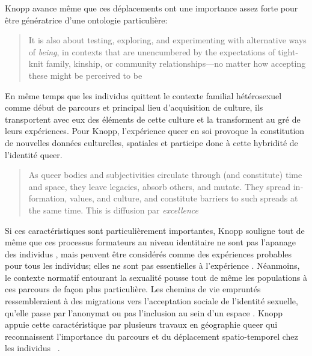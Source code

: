 Knopp avance même que ces déplacements ont une importance assez forte pour être génératrice d'une ontologie particulière:
\foreignblockquote{english}[{\cite[123]{Knopp2004}}][.]{It is also about testing, exploring, and experimenting with alternative ways of \emph{being}, in contexts that are unencumbered by the expectations of tight-knit family, kinship, or community relationships—no matter how accepting these might be perceived to be} 
En même temps que les individus \lgbt{} quittent le contexte familial hétérosexuel comme début de parcours et principal lieu d'acquisition de culture, ils transportent avec eux des éléments de cette culture et la transforment au gré de leurs expériences. 
Pour Knopp, l'expérience queer en soi provoque la constitution de nouvelles données culturelles, spatiales et participe donc à cette hybridité de l'identité queer.
\foreignblockquote{english}[{\cite[130]{Knopp2004}}][.]{As queer bodies and subjectivities circulate through (and constitute) time and space, they leave legacies, absorb others, and mutate. They spread information, values, and culture, and constitute barriers to such spreads at the same time. This is diffusion par \emph{excellence}}

Si ces caractéristiques sont particulièrement importantes, Knopp souligne tout de même que ces processus formateurs au niveau identitaire ne sont pas l'apanage des individus \lgbt{}, mais peuvent être considérés comme des expériences probables pour tous les individus; elles ne sont pas essentielles à l'expérience \lgbt{}.
Néanmoins, le contexte normatif entourant la sexualité pousse tout de même les populations \lgbt{} à ces parcours de façon plus particulière. 
Les chemins de vie empruntés ressembleraient à des migrations vers l'acceptation sociale de l'identité sexuelle, qu'elle passe par l'anonymat ou pas l'inclusion au sein d'un espace \lgbt{}. 
Knopp appuie cette caractéristique par plusieurs travaux en géographie queer qui reconnaissent l'importance du parcours et du déplacement spatio-temporel chez les individus \lgbt{}~\citep[123]{Knopp2004}.




